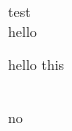 \documentclass[dvipdfmx]{jsarticle}
\begin{document}
test \\
hello \\
\hspace*{5mm}
\begin{minipage}{\textwidth}
  hello
  this
\end{minipage} \\
no
\end{document}
